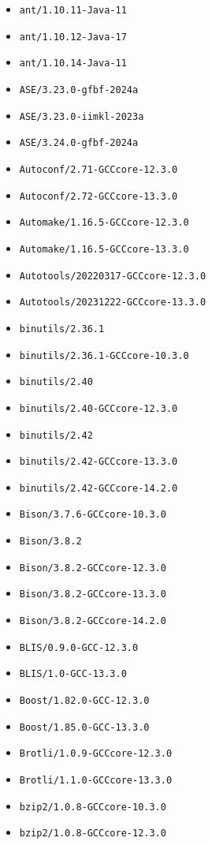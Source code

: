 \scriptsize
\begin{multicols}{3}
\begin{itemize}
\item \verb|ant/1.10.11-Java-11|
\item \verb|ant/1.10.12-Java-17|
\item \verb|ant/1.10.14-Java-11|
\item \verb|ASE/3.23.0-gfbf-2024a|
\item \verb|ASE/3.23.0-iimkl-2023a|
\item \verb|ASE/3.24.0-gfbf-2024a|
\item \verb|Autoconf/2.71-GCCcore-12.3.0|
\item \verb|Autoconf/2.72-GCCcore-13.3.0|
\item \verb|Automake/1.16.5-GCCcore-12.3.0|
\item \verb|Automake/1.16.5-GCCcore-13.3.0|
\item \verb|Autotools/20220317-GCCcore-12.3.0|
\item \verb|Autotools/20231222-GCCcore-13.3.0|
\item \verb|binutils/2.36.1|
\item \verb|binutils/2.36.1-GCCcore-10.3.0|
\item \verb|binutils/2.40|
\item \verb|binutils/2.40-GCCcore-12.3.0|
\item \verb|binutils/2.42|
\item \verb|binutils/2.42-GCCcore-13.3.0|
\item \verb|binutils/2.42-GCCcore-14.2.0|
\item \verb|Bison/3.7.6-GCCcore-10.3.0|
\item \verb|Bison/3.8.2|
\item \verb|Bison/3.8.2-GCCcore-12.3.0|
\item \verb|Bison/3.8.2-GCCcore-13.3.0|
\item \verb|Bison/3.8.2-GCCcore-14.2.0|
\item \verb|BLIS/0.9.0-GCC-12.3.0|
\item \verb|BLIS/1.0-GCC-13.3.0|
\item \verb|Boost/1.82.0-GCC-12.3.0|
\item \verb|Boost/1.85.0-GCC-13.3.0|
\item \verb|Brotli/1.0.9-GCCcore-12.3.0|
\item \verb|Brotli/1.1.0-GCCcore-13.3.0|
\item \verb|bzip2/1.0.8-GCCcore-10.3.0|
\item \verb|bzip2/1.0.8-GCCcore-12.3.0|

\end{itemize}
\end{multicols}
